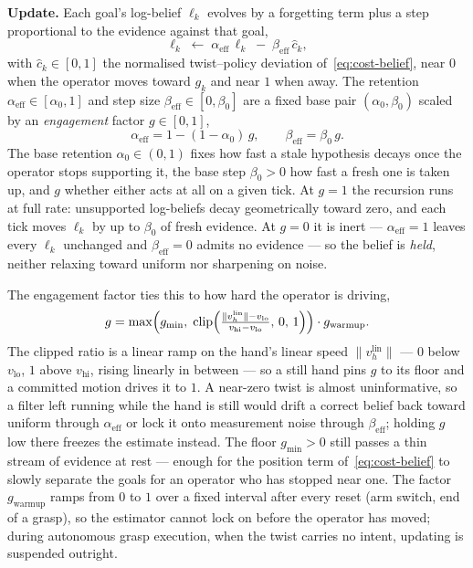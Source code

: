 \documentclass[12pt,a4paper,twoside,openright]{report}
\begin{document}
\textbf{Update.} Each goal's log-belief $\ell_k$ evolves by a forgetting term plus a step proportional to the evidence against that goal,
\begin{equation}
\ell_k \;\leftarrow\; \alpha_{\text{eff}}\,\ell_k \;-\; \beta_{\text{eff}}\,\hat{c}_k,
\label{eq:beliefupdate}
\end{equation}
with $\hat{c}_k \in [0,1]$ the normalised twist--policy deviation of~\eqref{eq:cost-belief}, near $0$ when the operator moves toward $g_k$ and near $1$ when away. The retention $\alpha_{\text{eff}} \in [\alpha_0, 1]$ and step size $\beta_{\text{eff}} \in [0, \beta_0]$ are a fixed base pair $(\alpha_0, \beta_0)$ scaled by an \emph{engagement} factor $g \in [0,1]$,
\begin{equation}
\alpha_{\text{eff}} = 1 - (1 - \alpha_0)\,g,
\qquad
\beta_{\text{eff}} = \beta_0\, g.
\label{eq:effgains}
\end{equation}
The base retention $\alpha_0 \in (0,1)$ fixes how fast a stale hypothesis decays once the operator stops supporting it, the base step $\beta_0 > 0$ how fast a fresh one is taken up, and $g$ whether either acts at all on a given tick. At $g = 1$ the recursion runs at full rate: unsupported log-beliefs decay geometrically toward zero, and each tick moves $\ell_k$ by up to $\beta_0$ of fresh evidence. At $g = 0$ it is inert --- $\alpha_{\text{eff}} = 1$ leaves every $\ell_k$ unchanged and $\beta_{\text{eff}} = 0$ admits no evidence --- so the belief is \emph{held}, neither relaxing toward uniform nor sharpening on noise.

The engagement factor ties this to how hard the operator is driving,
\begin{equation}
g = \max\Bigl(g_{\min},\; \operatorname{clip}\Bigl(\tfrac{\|v_h^{\text{lin}}\| - v_{\text{lo}}}{v_{\text{hi}} - v_{\text{lo}}},\,0,\,1\Bigr)\Bigr)\cdot g_{\text{warmup}}.
\label{eq:engagement}
\end{equation}
The clipped ratio is a linear ramp on the hand's linear speed $\|v_h^{\text{lin}}\|$ --- $0$ below $v_{\text{lo}}$, $1$ above $v_{\text{hi}}$, rising linearly in between --- so a still hand pins $g$ to its floor and a committed motion drives it to $1$. A near-zero twist is almost uninformative, so a filter left running while the hand is still would drift a correct belief back toward uniform through $\alpha_{\text{eff}}$ or lock it onto measurement noise through $\beta_{\text{eff}}$; holding $g$ low there freezes the estimate instead. The floor $g_{\min} > 0$ still passes a thin stream of evidence at rest --- enough for the position term of~\eqref{eq:cost-belief} to slowly separate the goals for an operator who has stopped near one. The factor $g_{\text{warmup}}$ ramps from $0$ to $1$ over a fixed interval after every reset (arm switch, end of a grasp), so the estimator cannot lock on before the operator has moved; during autonomous grasp execution, when the twist carries no intent, updating is suspended outright.
\end{document}
